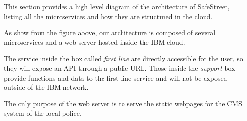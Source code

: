 This section provides a high level diagram of the architecture of SafeStreet, listing all the microservices and how they are structured in the cloud.


As show from the figure above, our architecture is composed of several microservices and a web server hosted inside the IBM cloud.

The service inside the box called \textit{first line} are directly accessible for the user, so they will expose an API through a public URL.
Those inside the \textit{support} box provide functions and data to the first line service and will not be exposed outside of the IBM network.

The only purpose of the web server is to serve the static webpages for the CMS system of the local police.